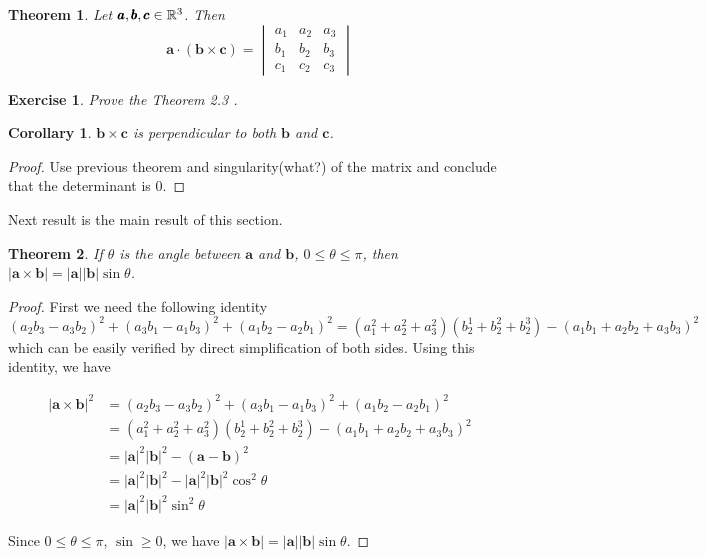 \documentclass[12pt]{article}
\newtheorem{thm}{Theorem}[section]
\newtheorem{exercise}{Exercise}[section]
\newtheorem{corollary}{Corollary}[section]
\begin{document}
\begin{thm}
  Let $\pmb{a}, \pmb{b}, \pmb{c} \in \mathbb{R}^3$. Then 
  \[
    \pmb{a} \cdot (\pmb{b} \times \pmb{c}) =  
    \begin{vmatrix}
      a_1 & a_2 & a_3 \\
      b_1 & b_2 & b_3 \\
      c_1 & c_2 & c_3
    \end{vmatrix}
  \]
\end{thm}

\begin{exercise}
  Prove the Theorem 2.3 .
\end{exercise}

\begin{corollary}
  $\pmb{b} \times \pmb{c}$ is perpendicular to both $\pmb{b}$ and $\pmb{c}$.
\end{corollary}

\begin{proof}
  Use previous theorem and singularity(what?) of the matrix and conclude that the determinant is $0$.
\end{proof}

Next result is the main result of this section.

\begin{thm}
  If $\theta$ is the angle between $\pmb{a}$ and $\pmb{b}$, $0\leq \theta \leq \pi$, then $|\pmb{a} \times \pmb{b}| = |\pmb{a}||\pmb{b}| \sin \theta$.
\end{thm}
\begin{proof}
  First we need the following identity
  $$(a_2b_3-a_3b_2)^2+(a_3b_1-a_1b_3)^2+(a_1b_2-a_2b_1)^2=(a_1^2+a_2^2+a^2_3)(b_2^1+b_2^2+b_2^3)-(a_1b_1+a_2b_2+a_3b_3)^2$$
  which can be easily verified by direct simplification of both sides.
  Using this identity, we have
  
  \begin{align*}
    |\pmb{a} \times \pmb{b}|^2 &= (a_2b_3-a_3b_2)^2+(a_3b_1-a_1b_3)^2+(a_1b_2-a_2b_1)^2 \\
      &= (a_1^2+a_2^2+a^2_3)(b_2^1+b_2^2+b_2^3)-(a_1b_1+a_2b_2+a_3b_3)^2 \\
      &= |\pmb{a}|^2|\pmb{b}|^2 - (\pmb{a} - \pmb{b})^2 \\
      &= |\pmb{a}|^2|\pmb{b}|^2 - |\pmb{a}|^2|\pmb{b}|^2\cos^2 \theta \\
      &= |\pmb{a}|^2|\pmb{b}|^2\sin^2 \theta
  \end{align*}

  Since $0 \leq \theta \leq \pi$, $\sin \geq 0$, we have $|\pmb{a} \times \pmb{b}| = |\pmb{a}||\pmb{b}|\sin \theta$.
\end{proof}
\end{document}
